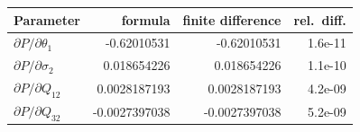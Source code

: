 \begin{tabular}{lrrr}\toprule
Parameter & formula & finite difference & rel.\ diff.\\\midrule
$\partial P/\partial\theta_1$ & -0.62010531 & -0.62010531 & 1.6e-11\\
$\partial P/\partial\sigma_2$ & 0.018654226 & 0.018654226 & 1.1e-10\\
$\partial P/\partial Q_{12}$ & 0.0028187193 & 0.0028187193 & 4.2e-09\\
$\partial P/\partial Q_{32}$ & -0.0027397038 & -0.0027397038 & 5.2e-09\\
\bottomrule\end{tabular}

